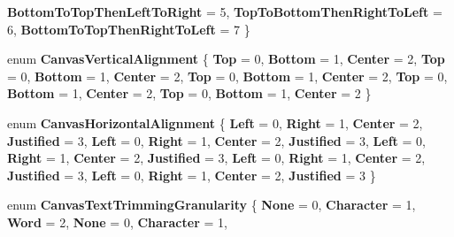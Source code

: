 \begin{DoxyCompactItemize}
{\bfseries Bottom\+To\+Top\+Then\+Left\+To\+Right} = 5, 
{\bfseries Top\+To\+Bottom\+Then\+Right\+To\+Left} = 6, 
{\bfseries Bottom\+To\+Top\+Then\+Right\+To\+Left} = 7
 \}
\item 
\mbox{\label{namespace_microsoft_1_1_graphics_1_1_canvas_1_1_text_a152840fdbab49a06690e74695359e3fd}} 
enum {\bfseries Canvas\+Vertical\+Alignment} \{ \newline
{\bfseries Top} = 0, 
{\bfseries Bottom} = 1, 
{\bfseries Center} = 2, 
{\bfseries Top} = 0, 
\newline
{\bfseries Bottom} = 1, 
{\bfseries Center} = 2, 
{\bfseries Top} = 0, 
{\bfseries Bottom} = 1, 
\newline
{\bfseries Center} = 2, 
{\bfseries Top} = 0, 
{\bfseries Bottom} = 1, 
{\bfseries Center} = 2, 
\newline
{\bfseries Top} = 0, 
{\bfseries Bottom} = 1, 
{\bfseries Center} = 2
 \}
\item 
\mbox{\label{namespace_microsoft_1_1_graphics_1_1_canvas_1_1_text_afbe7037cb35da011cc144d6cb2d328f5}} 
enum {\bfseries Canvas\+Horizontal\+Alignment} \{ \newline
{\bfseries Left} = 0, 
{\bfseries Right} = 1, 
{\bfseries Center} = 2, 
{\bfseries Justified} = 3, 
\newline
{\bfseries Left} = 0, 
{\bfseries Right} = 1, 
{\bfseries Center} = 2, 
{\bfseries Justified} = 3, 
\newline
{\bfseries Left} = 0, 
{\bfseries Right} = 1, 
{\bfseries Center} = 2, 
{\bfseries Justified} = 3, 
\newline
{\bfseries Left} = 0, 
{\bfseries Right} = 1, 
{\bfseries Center} = 2, 
{\bfseries Justified} = 3, 
\newline
{\bfseries Left} = 0, 
{\bfseries Right} = 1, 
{\bfseries Center} = 2, 
{\bfseries Justified} = 3
 \}
\item 
\mbox{\label{namespace_microsoft_1_1_graphics_1_1_canvas_1_1_text_a24d5fc875e6366ffdebd4fc9db910c21}} 
enum {\bfseries Canvas\+Text\+Trimming\+Granularity} \{ \newline
{\bfseries None} = 0, 
{\bfseries Character} = 1, 
{\bfseries Word} = 2, 
{\bfseries None} = 0, 
\newline
{\bfseries Character} = 1, 

\end{DoxyCompactItemize}
